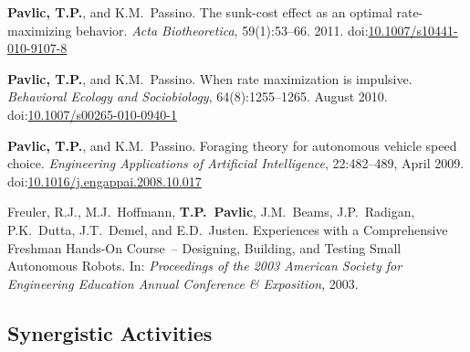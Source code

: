 \documentclass[svgnames,11pt]{article}
\newcommand\doilink[1]{\href{http://dx.doi.org/#1}{#1}}
\newcommand\doi[1]{doi:\doilink{#1}}
\begin{document}
\begin{bibenum}[itemsep=5pt]
    \item \textbf{Pavlic, T.P.}, and K.M.~Passino. The sunk-cost effect as an
        optimal rate-maximizing behavior. \emph{Acta Biotheoretica},
        59(1):53--66. 2011. \doi{10.1007/s10441-010-9107-8}

    \item \textbf{Pavlic, T.P.}, and K.M.~Passino. When rate maximization is
        impulsive. \emph{Behavioral Ecology and Sociobiology},
        64(8):1255--1265. August 2010. \doi{10.1007/s00265-010-0940-1}

    \item \textbf{Pavlic, T.P.}, and K.M.~Passino. Foraging theory for
        autonomous vehicle speed choice. \emph{Engineering Applications
        of Artificial Intelligence}, 22:482--489, April 2009.
        \doi{10.1016/j.engappai.2008.10.017}

    \item Freuler, R.J., M.J.~Hoffmann, \textbf{T.P.~Pavlic}, J.M.~Beams,
        J.P.~Radigan, P.K.~Dutta, J.T.~Demel, and E.D.~Justen.
        Experiences with a Comprehensive Freshman Hands-On Course~--
        Designing, Building, and Testing Small Autonomous Robots. In:
        \emph{Proceedings of the 2003 American Society for Engineering
        Education Annual Conference \& Exposition}, 2003.

\end{bibenum}

\subsection{Synergistic Activities}
\end{document}
